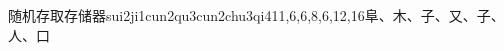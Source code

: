 \begin{EntryWithPhonetic}{随机存取存储器}{sui2ji1cun2qu3cun2chu3qi4}{11,6,6,8,6,12,16}{⾩、⽊、⼦、⼜、⼦、⼈、⼝}
\end{EntryWithPhonetic}


